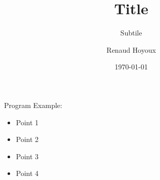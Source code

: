 \documentclass{beamer}
\title{Title}
\subtitle{Subtile}
\author{Renaud Hoyoux}
\institute{Research Unit - Université de Liège}
\date{\today}
\begin{document}
\begin{frame}[plain]
	\titlepage
\end{frame}

\begin{frame}{Program}
Example:
\begin{itemize}
\item Point 1
\item Point 2
\item Point 3
\item Point 4
\end{itemize}
\end{frame}
\end{document}
